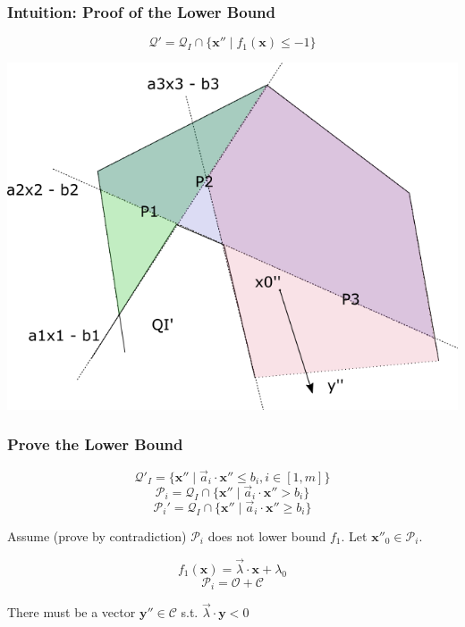 \documentclass[11pt]{beamer}
\begin{document}
\begin{frame}\frametitle{Intuition: Proof of the Lower Bound}
\[\mathcal{Q}' = \mathcal{Q}_I\cap \{\textbf{x}''\mid f_1(\textbf{x}) \le -1\}\]
\begin{center}
\includegraphics[scale = 0.4]{lowerbound.png}
\end{center}
\end{frame}

\begin{frame}
\frametitle{Prove the Lower Bound}

\[\mathcal{Q}'_I = \{\textbf{x}'' \mid \vec{a}_i\cdot \textbf{x}'' \le b_i, i \in [1, m]\}\]
\[\mathcal{P}_i = \mathcal{Q}_I \cap \{\textbf{x}''\mid \vec{a}_i \cdot \textbf{x}'' > b_i\}\]
\[\mathcal{P}_i' = \mathcal{Q}_I \cap \{\textbf{x}''\mid \vec{a}_i \cdot \textbf{x}'' \ge b_i\}\]




Assume (prove by contradiction) $\mathcal{P}_i$ does not lower bound $f_1$.
Let $\textbf{x}''_0\in \mathcal{P}_i$.

\[f_1(\textbf{x}) = \vec{\lambda}\cdot \textbf{x} + \lambda_0 \]
\[\mathcal{P}_i = \mathcal{O} + \mathcal{C}\]

There must be a vector $\textbf{y}''\in \mathcal{C}$ s.t. $\vec{\lambda}\cdot \textbf{y}  < 0$


\end{frame}
\end{document}
